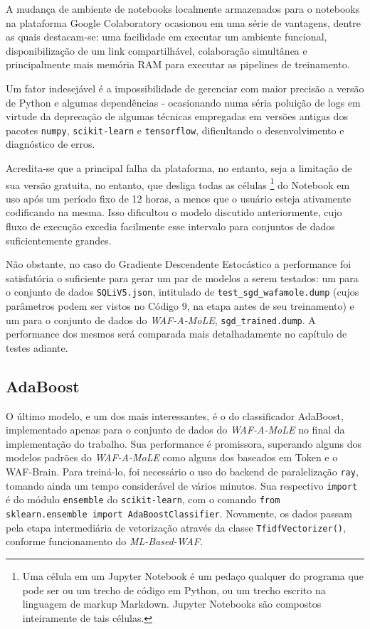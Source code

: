 A mudança de ambiente de notebooks localmente armazenados para o notebooks na plataforma Google Colaboratory ocasionou em uma série de vantagens, dentre as quais destacam-se: uma facilidade em executar um ambiente funcional, disponibilização de um link compartilhável, colaboração simultânea e principalmente mais memória RAM para executar as pipelines de treinamento. 

Um fator indesejável é a impossibilidade de gerenciar com maior precisão a versão de Python e algumas dependências - ocasionando numa séria poluição de logs em virtude da deprecação de algumas técnicas empregadas em versões antigas dos pacotes \verb+numpy+, \verb+scikit-learn+ e \verb+tensorflow+, dificultando o desenvolvimento e diagnóstico de erros. 

Acredita-se que a principal falha da plataforma, no entanto, seja a limitação de sua versão gratuita, no entanto, que desliga todas as células \footnote{Uma célula em um Jupyter Notebook é um pedaço qualquer do programa que pode ser ou um trecho de código em Python, ou um trecho escrito na linguagem de markup Markdown. Jupyter Notebooks são compostos inteiramente de tais células.} do Notebook em uso após um período fixo de 12 horas, a menos que o usuário esteja ativamente codificando na mesma. Isso dificultou o modelo discutido anteriormente, cujo fluxo de execução excedia facilmente esse intervalo para conjuntos de dados suficientemente grandes.

Não obstante, no caso do Gradiente Descendente Estocástico a performance foi satisfatória o suficiente para gerar um par de modelos a serem testados: um para o conjunto de dados \verb+SQLiV5.json+, intitulado de \verb+test_sgd_wafamole.dump+ (cujos parâmetros podem ser vistos no Código 9, na etapa antes de seu treinamento) e um para o conjunto de dados do \textit{WAF-A-MoLE}, \verb+sgd_trained.dump+. A performance dos mesmos será comparada mais detalhadamente no capítulo de testes adiante. 

\label{sec:codigos:modelos}
\bigskip

\subsection{AdaBoost}

O último modelo, e um dos mais interessantes, é o do classificador AdaBoost, implementado apenas para o conjunto de dados do \textit{WAF-A-MoLE} no final da implementação do trabalho. Sua performance é promissora, superando alguns dos modelos padrões do \textit{WAF-A-MoLE} como alguns dos baseados em Token e o WAF-Brain. Para treiná-lo, foi necessário o uso do backend de paralelização \verb+ray+, tomando ainda um tempo considerável de vários minutos. Sua respectivo \verb+import+ é do módulo \verb+ensemble+ do \verb+scikit-learn+, com o comando \verb+from sklearn.ensemble import AdaBoostClassifier+. Novamente, os dados passam pela etapa intermediária de vetorização através da classe \verb+TfidfVectorizer()+, conforme funcionamento do \textit{ML-Based-WAF}. 


